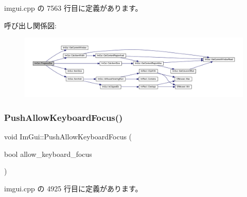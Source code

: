  imgui.\+cpp の 7563 行目に定義があります。

呼び出し関係図\+:\nopagebreak
\begin{figure}[H]
\begin{center}
\leavevmode
\includegraphics[width=350pt]{namespace_im_gui_a83349d38c7c73f92ae977bc5b530a9e9_cgraph}
\end{center}
\end{figure}
\mbox{\label{namespace_im_gui_adf7c3cfdcbb06617bb70ff1526d064f4}} 
\subsubsection{\texorpdfstring{Push\+Allow\+Keyboard\+Focus()}{PushAllowKeyboardFocus()}}
{\footnotesize\ttfamily void Im\+Gui\+::\+Push\+Allow\+Keyboard\+Focus (\begin{DoxyParamCaption}\item[{bool}]{allow\+\_\+keyboard\+\_\+focus }\end{DoxyParamCaption})}



 imgui.\+cpp の 4925 行目に定義があります。

